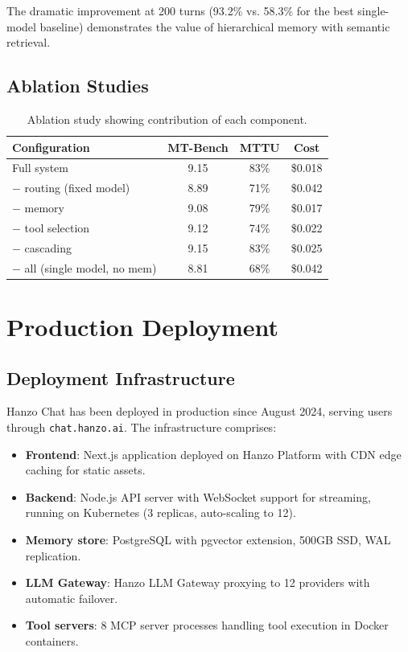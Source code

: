 \documentclass[11pt,twocolumn]{article}
\begin{document}
The dramatic improvement at 200 turns (93.2\% vs. 58.3\% for the best single-model baseline) demonstrates the value of hierarchical memory with semantic retrieval.

\subsection{Ablation Studies}

\begin{table}[H]
\centering
\small
\begin{tabular}{lccc}
\toprule
\textbf{Configuration} & \textbf{MT-Bench} & \textbf{MTTU} & \textbf{Cost} \\
\midrule
Full system & 9.15 & 83\% & \$0.018 \\
$-$ routing (fixed model) & 8.89 & 71\% & \$0.042 \\
$-$ memory & 9.08 & 79\% & \$0.017 \\
$-$ tool selection & 9.12 & 74\% & \$0.022 \\
$-$ cascading & 9.15 & 83\% & \$0.025 \\
$-$ all (single model, no mem) & 8.81 & 68\% & \$0.042 \\
\bottomrule
\end{tabular}
\caption{Ablation study showing contribution of each component.}
\label{tab:ablation}
\end{table}

\section{Production Deployment}
\label{sec:production}

\subsection{Deployment Infrastructure}

Hanzo Chat has been deployed in production since August 2024, serving users through \texttt{chat.hanzo.ai}. The infrastructure comprises:

\begin{itemize}[leftmargin=1.1em]
    \item \textbf{Frontend}: Next.js application deployed on Hanzo Platform with CDN edge caching for static assets.
    \item \textbf{Backend}: Node.js API server with WebSocket support for streaming, running on Kubernetes (3 replicas, auto-scaling to 12).
    \item \textbf{Memory store}: PostgreSQL with pgvector extension, 500GB SSD, WAL replication.
    \item \textbf{LLM Gateway}: Hanzo LLM Gateway proxying to 12 providers with automatic failover.
    \item \textbf{Tool servers}: 8 MCP server processes handling tool execution in Docker containers.
\end{itemize}
\end{document}
